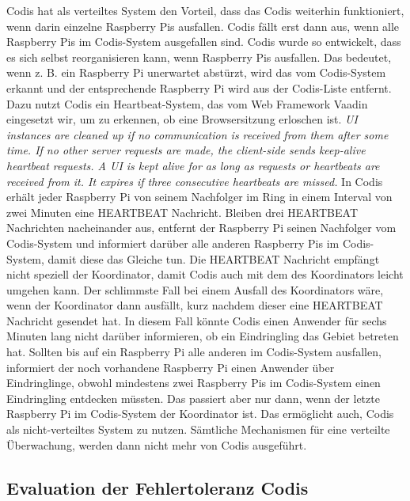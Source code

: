 \documentclass[journal]{IEEEtran}
\begin{document}
Codis hat als verteiltes System den Vorteil, dass das Codis weiterhin funktioniert, wenn darin einzelne Raspberry Pis ausfallen. Codis fällt erst dann aus, wenn alle Raspberry Pis im Codis-System ausgefallen sind. Codis wurde so entwickelt, dass es sich selbst reorganisieren kann, wenn Raspberry Pis ausfallen. Das bedeutet, wenn z. B. ein Raspberry Pi unerwartet abstürzt, wird das vom Codis-System erkannt und der entsprechende Raspberry Pi wird aus der Codis-Liste entfernt. Dazu nutzt Codis ein Heartbeat-System, das vom Web Framework Vaadin eingesetzt wir, um zu erkennen, ob eine Browsersitzung erloschen ist. \textit{UI instances are cleaned up if no communication is received from them after some time. If no other server requests are made, the client-side sends keep-alive heartbeat requests. A UI is kept alive for as long as requests or heartbeats are received from it. It expires if three consecutive heartbeats are missed.}\cite[S. 95]{vaadin} In Codis erhält jeder Raspberry Pi von seinem Nachfolger im Ring in einem Interval von zwei Minuten eine \MakeUppercase{heartbeat} Nachricht. Bleiben drei \MakeUppercase{heartbeat} Nachrichten nacheinander aus, entfernt der Raspberry Pi seinen Nachfolger vom Codis-System und informiert darüber alle anderen Raspberry Pis im Codis-System, damit diese das Gleiche tun. Die \MakeUppercase{heartbeat} Nachricht empfängt nicht speziell der Koordinator, damit Codis auch mit dem des Koordinators leicht umgehen kann. Der schlimmste Fall bei einem Ausfall des Koordinators wäre, wenn der Koordinator dann ausfällt, kurz nachdem dieser eine \MakeUppercase{heartbeat} Nachricht gesendet hat. In diesem Fall könnte Codis einen Anwender für sechs Minuten lang nicht darüber informieren, ob ein Eindringling das Gebiet betreten hat. Sollten bis auf ein Raspberry Pi alle anderen im Codis-System ausfallen, informiert der noch vorhandene Raspberry Pi einen Anwender über Eindringlinge, obwohl mindestens zwei Raspberry Pis im Codis-System einen Eindringling entdecken müssten. Das passiert aber nur dann, wenn der letzte Raspberry Pi im Codis-System der Koordinator ist. Das ermöglicht auch, Codis als nicht-verteiltes System zu nutzen. Sämtliche Mechanismen für eine verteilte Überwachung, werden dann nicht mehr von Codis ausgeführt.

\subsection{Evaluation der Fehlertoleranz Codis}
\end{document}
